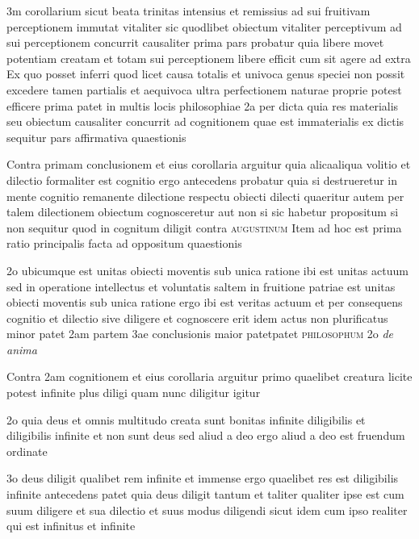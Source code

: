 \documentclass[twoside, openright]{article}
\newcommand{\name}[1]{\textsc{#1}}
\newcommand{\worktitle}[1]{\textit{#1}}
\begin{document}
        \pstart
        3m corollarium sicut beata trinitas intensius et remissius ad sui fruitivam perceptionem immutat vitaliter sic quodlibet obiectum vitaliter perceptivum ad sui perceptionem concurrit causaliter prima pars probatur quia libere movet potentiam creatam et totam sui perceptionem libere efficit cum sit agere ad extra  Ex quo posset inferri quod licet causa totalis et univoca genus speciei non possit excedere tamen partialis et aequivoca ultra perfectionem naturae proprie potest efficere prima patet in multis locis philosophiae 2a per dicta quia res materialis seu obiectum causaliter concurrit ad cognitionem quae est immaterialis ex dictis sequitur pars affirmativa quaestionis
        \pend
     
        \pstart
        Contra primam conclusionem et eius corollaria arguitur quia alicaaliqua volitio et dilectio formaliter est cognitio ergo antecedens probatur quia si destrueretur in mente cognitio remanente dilectione respectu obiecti dilecti quaeritur autem per talem dilectionem obiectum cognosceretur aut non si sic habetur propositum si non sequitur quod in cognitum diligit contra \name{augustinum} Item ad hoc est prima ratio principalis facta ad oppositum quaestionis 
        \pend
     
        \pstart
        2o ubicumque est unitas obiecti moventis sub unica ratione ibi est unitas actuum sed in operatione intellectus et voluntatis saltem in fruitione patriae est unitas obiecti moventis sub unica ratione ergo ibi est veritas actuum et per consequens cognitio et dilectio sive diligere et cognoscere erit idem actus non plurificatus minor patet  2am partem 3ae conclusionis maior patetpatet  \name{philosophum} 2o \worktitle{de anima}
        \pend
     
        \pstart
        Contra 2am cognitionem et eius corollaria arguitur primo quaelibet creatura licite potest infinite plus diligi quam nunc diligitur igitur
        \pend
     
        \pstart
        2o quia deus et omnis multitudo creata sunt bonitas infinite diligibilis et diligibilis infinite et non sunt deus sed aliud a deo ergo aliud a deo est fruendum ordinate
        \pend
     
        \pstart
        3o deus diligit qualibet rem infinite et immense ergo quaelibet res est diligibilis infinite antecedens patet quia deus diligit tantum et taliter qualiter ipse est cum suum diligere et sua dilectio et suus modus diligendi sicut idem cum ipso realiter qui est infinitus et infinite
        \pend
     
\end{document}
